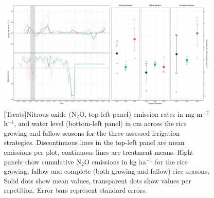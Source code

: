 
\begin{figure}[htbp]
\captionsetup{justification=justified}
	\centering 
    	\includegraphics[scale=0.35, center]{Figures/Chapter_2/N2O_flux_acc_water.pdf}
	[Treats]{Nitrous oxide (N$_{2}$O, top-left panel) emission rates in mg m$^{-2}$ h$^{-1}$, and water level (bottom-left panel) in cm across the rice growing and fallow seasons for the three assessed irrigation strategies. Discontinuous lines in the top-left panel are mean emissions per plot, continuous lines are treatment means. Right panels show cumulative N$_{2}$O emissions in kg ha$^{-1}$ for the rice growing, fallow and complete (both growing and fallow) rice seasons. Solid dots show mean values, transparent dots show values per repetition. Error bars represent standard errors.}   
	\label{N2O}
\end{figure}


